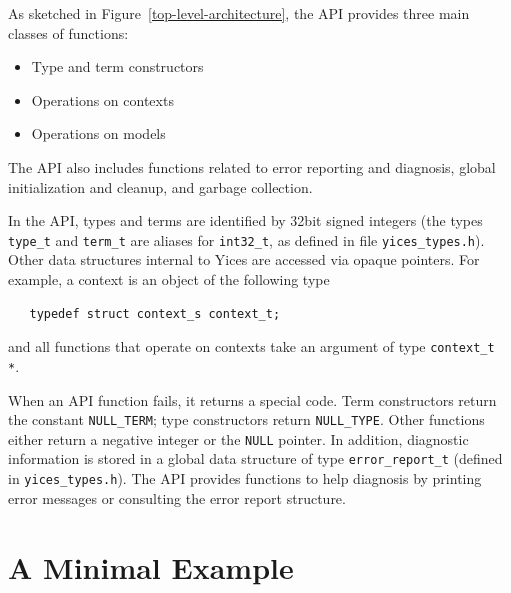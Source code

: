 \documentclass[11pt,twoside,fleqn,openright,titlepage]{cslreport}
\begin{document}

As sketched in Figure~\ref{top-level-architecture}, the API provides
three main classes of functions:
\begin{itemize}
\item Type and term constructors
\item Operations on contexts
\item Operations on models
\end{itemize}
The API also includes functions related to error reporting and
diagnosis, global initialization and cleanup, and garbage collection.

In the API, types and terms are identified by 32bit signed integers
(the types \texttt{type\_t} and \texttt{term\_t} are aliases for
\texttt{int32\_t}, as defined in file \texttt{yices\_types.h}). Other
data structures internal to Yices are accessed via opaque
pointers. For example, a context is an object of the following type
\begin{small}
\begin{verbatim}
   typedef struct context_s context_t;
\end{verbatim}
\end{small}
and all functions that operate on contexts take an argument of type
\texttt{context\_t *}.

When an API function fails, it returns a special code. Term
constructors return the constant \texttt{NULL\_TERM}; type
constructors return \texttt{NULL\_TYPE}. Other functions either return
a negative integer or the \texttt{NULL} pointer. In addition,
diagnostic information is stored in a global data structure of type
\texttt{error\_report\_t} (defined in \texttt{yices\_types.h}). The API
provides functions to help diagnosis by printing error messages or
consulting the error report structure.




\section{A Minimal Example}
\end{document}
